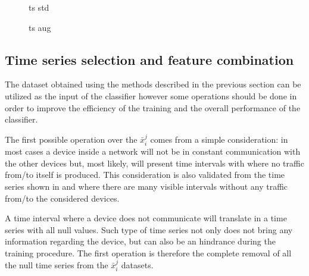 \begin{figure}
    \centering

\caption{ts std}
    \label{fig:ts_std}
\end{figure}


\begin{figure}
    \centering

\caption{ts aug}
    \label{fig:ts_aug}
\end{figure}

\subsection{Time series selection and feature combination}

The dataset obtained using the methods described in the previous section can be utilized as the input of the classifier however some operations should be done in order to improve the efficiency of the training and the overall performance of the classifier.

The first possible operation over the $\bar{x}_i^j$ comes from a simple consideration: in most cases a device inside a network will not be in constant communication with the other devices but, most likely, will present time intervals with where no traffic from/to itself is produced. This consideration is also validated from the time series shown in  and  where there are many visible intervals without any traffic from/to the considered devices.

A time interval where a device does not communicate will translate in a time series with all null values. Such type of time series not only does not bring any information regarding the device, but can also be an hindrance during the training procedure. The first operation is therefore the complete removal of all the null time series from the $\bar{x}_i^j$ datasets.


